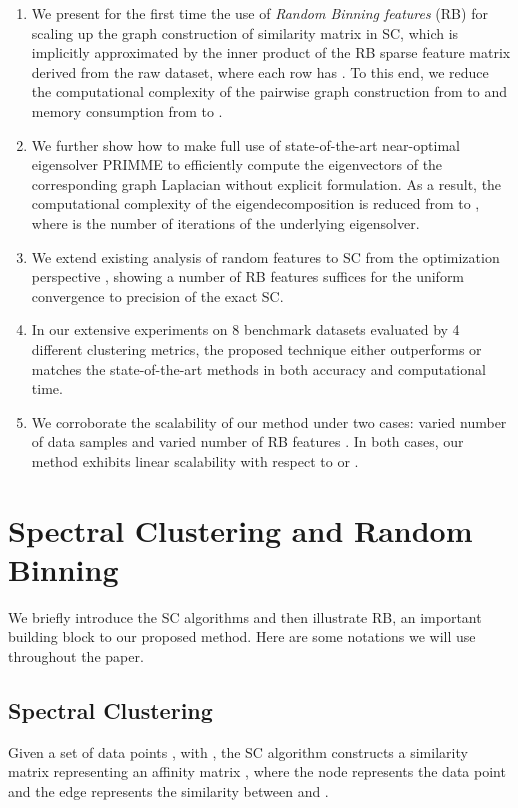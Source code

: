 \documentclass[sigconf]{acmart}
\newcommand{\1}{\boldsymbol{1}}
\newcommand{\0}{\boldsymbol{0}}
\begin{document}
\begin{enumerate}
\item  We present for the first time the use of \emph{Random Binning features} (RB) \cite{rahimi2008random,wu2016revisiting} for scaling up the graph construction of similarity matrix in SC, which is implicitly approximated by the inner product of the RB sparse feature matrix  derived from the raw dataset, where each row has . To this end, we reduce the computational complexity of the pairwise graph construction from  to  and memory consumption from  to . 

\item We further show how to make full use of state-of-the-art near-optimal eigensolver PRIMME \cite{stathopoulos2010primme,wu2017primme_svds} to  efficiently compute the eigenvectors of the corresponding graph Laplacian  without explicit formulation. As a result, the computational complexity of the eigendecomposition is reduced from  to , where  is the number of iterations of the underlying eigensolver.  

\item We extend existing analysis of random features to SC from the optimization perspective \cite{wu2016revisiting}, showing a number {} of RB features suffices for the uniform convergence to  precision of the exact SC.

\item In our extensive experiments on 8 benchmark datasets evaluated by 4 different clustering metrics, the proposed technique either outperforms or matches the state-of-the-art methods in both accuracy and computational time. 

\item We corroborate the scalability of our method under two cases: varied number of data samples  and varied number of RB features . In both cases, our method exhibits linear scalability with respect to  or .

\end{enumerate}




\section{Spectral Clustering and Random Binning}
We briefly introduce the SC algorithms and then illustrate RB, an important building block to our proposed method. Here are some notations we will use throughout the paper.

\subsection{Spectral Clustering}
Given a set of  data points , with  , the SC algorithm constructs a similarity matrix  representing an affinity matrix , where the node  represents the data point  and the edge  represents the similarity between   and . 
\end{document}
